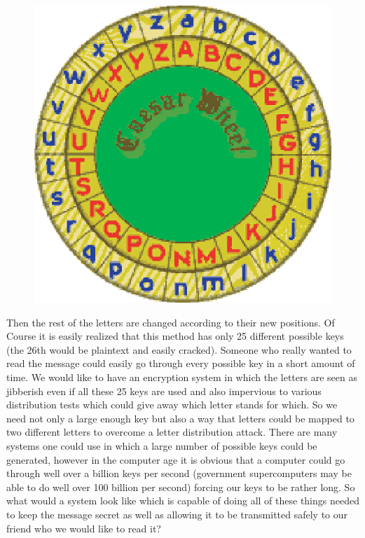 \documentclass[12pt]{report}
\begin{document}
\begin{figure}[h]
\centering
\caption{}
\cite{ceaser}
\includegraphics[scale=.3]{ceaser.eps}
\end{figure}

Then the rest of the letters are changed according to their new positions.  Of Course it is easily realized that this method has only 25 different possible keys (the 26th would be plaintext and easily cracked).  Someone who really wanted to read the message could easily go through every possible key in a short amount of time.  We would like to have an encryption system in which the letters are seen as jibberish even if all these 25 keys are used and also impervious to various distribution tests which could give away which letter stands for which. So we need not only a large enough key but also a way that letters could be mapped to two different letters to overcome a letter distribution attack.  There are many systems one could use in which a large number of possible keys could be generated, however in the computer age it is obvious that a computer could go through well over a billion keys per second (government supercomputers may be able to do well over 100 billion per second) forcing our keys to be rather long.  So what would a system look like which is capable of doing all of these things needed to keep the message secret as well as allowing it to be transmitted safely to our friend who we would like to read it? 
\end{document}
